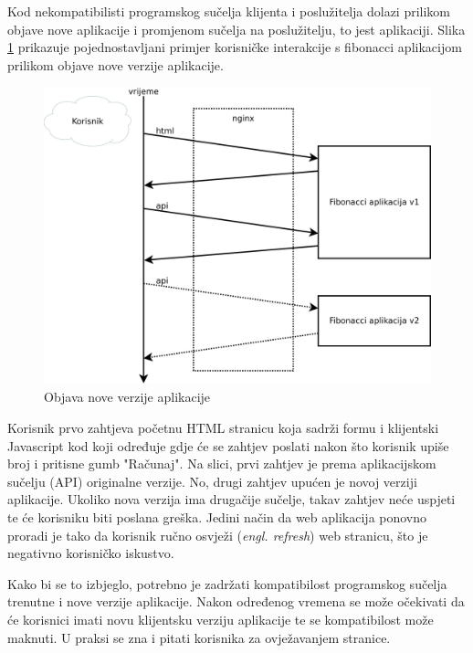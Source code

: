 Kod nekompatibilisti programskog sučelja klijenta i poslužitelja dolazi prilikom objave nove
aplikacije i promjenom sučelja na poslužitelju, to jest aplikaciji. Slika \ref{fig:04request_flow}
prikazuje pojednostavljani primjer korisničke interakcije s fibonacci aplikacijom prilikom objave
nove verzije aplikacije.

\begin{figure}[h]
    \centering
    \includegraphics[width=\textwidth]{img/04/request_flow.png}
    \caption{Objava nove verzije aplikacije}%
    \label{fig:04request_flow}
\end{figure}

Korisnik prvo zahtjeva početnu HTML stranicu koja sadrži formu i klijentski Javascript kod koji
određuje gdje će se zahtjev poslati nakon što korisnik upiše broj i pritisne gumb "Računaj". Na
slici, prvi zahtjev je prema aplikacijskom sučelju (API) originalne verzije. No, drugi zahtjev
upućen je novoj verziji aplikacije. Ukoliko nova verzija ima drugačije sučelje, takav zahtjev neće
uspjeti te će korisniku biti poslana greška. Jedini način da web aplikacija ponovno proradi je tako
da korisnik ručno osvježi (\textit{engl. refresh}) web stranicu, što je negativno korisničko
iskustvo.

Kako bi se to izbjeglo, potrebno je zadržati kompatibilost programskog sučelja trenutne i nove
verzije aplikacije. Nakon određenog vremena se može očekivati da će korisnici imati novu klijentsku
verziju aplikacije te se kompatibilost može maknuti. U praksi se zna i pitati korisnika za
ovježavanjem stranice.

